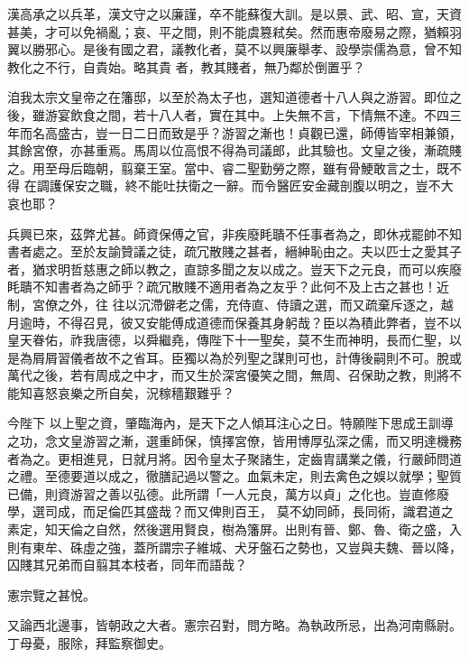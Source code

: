 \begin{pinyinscope}
 漢高承之以兵革，漢文守之以廉謹，卒不能蘇復大訓。是以景、武、昭、宣，天資甚美，才可以免禍亂；哀、平之間，則不能虞篡弒矣。然而惠帝廢易之際，猶賴羽翼以勝邪心。是後有國之君，議教化者，莫不以興廉舉孝、設學崇儒為意，曾不知教化之不行，自貴始。略其貴
 者，教其賤者，無乃鄰於倒置乎？



 洎我太宗文皇帝之在籓邸，以至於為太子也，選知道德者十八人與之游習。即位之後，雖游宴飲食之間，若十八人者，實在其中。上失無不言，下情無不達。不四三年而名高盛古，豈一日二日而致是乎？游習之漸也！貞觀已還，師傅皆宰相兼領，其餘宮僚，亦甚重焉。馬周以位高恨不得為司議郎，此其驗也。文皇之後，漸疏賤之。用至母后臨朝，翦棄王室。當中、睿二聖勤勞之際，雖有骨鯁敢言之士，既不得
 在調護保安之職，終不能吐扶衛之一辭。而令醫匠安金藏剖腹以明之，豈不大哀也耶？



 兵興已來，茲弊尤甚。師資保傅之官，非疾廢眊聵不任事者為之，即休戎罷帥不知書者處之。至於友諭贊議之徒，疏冗散賤之甚者，縉紳恥由之。夫以匹士之愛其子者，猶求明哲慈惠之師以教之，直諒多聞之友以成之。豈天下之元良，而可以疾廢眊聵不知書者為之師乎？疏冗散賤不適用者為之友乎？此何不及上古之甚也！近制，宮僚之外，往
 往以沉滯僻老之儒，充侍直、侍讀之選，而又疏棄斥逐之，越月逾時，不得召見，彼又安能傅成道德而保養其身躬哉？臣以為積此弊者，豈不以皇天眷佑，祚我唐德，以舜繼堯，傳陛下十一聖矣，莫不生而神明，長而仁聖，以是為屑屑習儀者故不之省耳。臣獨以為於列聖之謀則可也，計傳後嗣則不可。脫或萬代之後，若有周成之中才，而又生於深宮優笑之間，無周、召保助之教，則將不能知喜怒哀樂之所自矣，況稼穡艱難乎？



 今陛下
 以上聖之資，肇臨海內，是天下之人傾耳注心之日。特願陛下思成王訓導之功，念文皇游習之漸，選重師保，慎擇宮僚，皆用博厚弘深之儒，而又明達機務者為之。更相進見，日就月將。因令皇太子聚諸生，定齒胄講業之儀，行嚴師問道之禮。至德要道以成之，徹膳記過以警之。血氣未定，則去禽色之娛以就學；聖質已備，則資游習之善以弘德。此所謂「一人元良，萬方以貞」之化也。豈直修廢學，選司成，而足倫匹其盛哉？而又俾則百王，
 莫不幼同師，長同術，識君道之素定，知天倫之自然，然後選用賢良，樹為籓屏。出則有晉、鄭、魯、衛之盛，入則有東牟、硃虛之強，蓋所謂宗子維城、犬牙盤石之勢也，又豈與夫魏、晉以降，囚賤其兄弟而自翦其本枝者，同年而語哉？



 憲宗覽之甚悅。



 又論西北邊事，皆朝政之大者。憲宗召對，問方略。為執政所忌，出為河南縣尉。丁母憂，服除，拜監察御史。




\end{pinyinscope}
